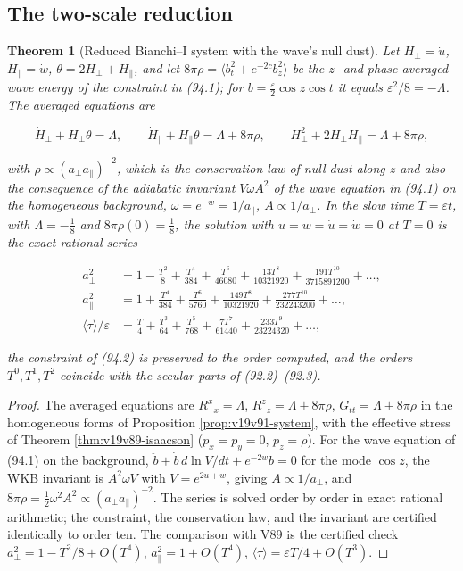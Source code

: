 \documentclass[11pt]{article}
\newtheorem{theorem}{Theorem}[section]
\theoremstyle{remark}
\begin{document}
\subsection{The two-scale reduction}

\begin{theorem}[Reduced Bianchi--I system with the wave's null dust]
\label{thm:v19v91-reduced}
Let \(H_\perp=\dot u\), \(H_\parallel=\dot w\),
\(\theta=2H_\perp+H_\parallel\), and let
\(8\pi\rho=\langle b_t^2+e^{-2c}b_z^2\rangle\) be the \(z\)- and
phase-averaged wave energy of the constraint in (94.1); for
\(b=\tfrac\varepsilon2\cos z\cos t\) it equals \(\varepsilon^2/8=-\Lambda\).
The averaged equations are

\[
 \dot H_\perp+H_\perp\theta=\Lambda,\qquad
 \dot H_\parallel+H_\parallel\theta=\Lambda+8\pi\rho,\qquad
 H_\perp^2+2H_\perp H_\parallel=\Lambda+8\pi\rho,                      \tag{94.2}
\]

with \(\rho\propto(a_\perp a_\parallel)^{-2}\), which is the
conservation law of null dust along \(z\) and also the consequence of
the adiabatic invariant \(V\omega A^2\) of the wave equation in (94.1)
on the homogeneous background, \(\omega=e^{-w}=1/a_\parallel\),
\(A\propto1/a_\perp\).  In the slow time \(T=\varepsilon t\), with
\(\Lambda=-\tfrac18\) and \(8\pi\rho(0)=\tfrac18\), the solution with
\(u=w=\dot u=\dot w=0\) at \(T=0\) is the exact rational series

\[
\begin{aligned}
 a_\perp^2&=1-\frac{T^2}8+\frac{T^4}{384}+\frac{T^6}{46080}+\frac{13T^8}{10321920}+\frac{191T^{10}}{3715891200}+\dots,\\
 a_\parallel^2&=1+\frac{T^4}{384}+\frac{T^6}{5760}+\frac{149T^8}{10321920}+\frac{277T^{10}}{232243200}+\dots,\\
 \langle\tau\rangle/\varepsilon&=\frac T4+\frac{T^3}{64}+\frac{T^5}{768}+\frac{7T^7}{61440}+\frac{233T^9}{23224320}+\dots,
\end{aligned}                                                          \tag{94.3}
\]

the constraint of (94.2) is preserved to the order computed, and the
orders \(T^0,T^1,T^2\) coincide with the secular parts of
(92.2)--(92.3).
\end{theorem}

\begin{proof}
The averaged equations are \(R^x{}_x=\Lambda\),
\(R^z{}_z=\Lambda+8\pi\rho\), \(G_{tt}=\Lambda+8\pi\rho\) in the
homogeneous forms of Proposition \ref{prop:v19v91-system}, with the
effective stress of Theorem \ref{thm:v19v89-isaacson}
(\(p_x=p_y=0\), \(p_z=\rho\)).  For the wave equation of (94.1) on the
background, \(\ddot b+\dot b\,d\ln V/dt+e^{-2w}b=0\) for the mode
\(\cos z\), the WKB invariant is \(A^2\omega V\) with \(V=e^{2u+w}\),
giving \(A\propto1/a_\perp\), and
\(8\pi\rho=\tfrac12\omega^2A^2\propto(a_\perp a_\parallel)^{-2}\).  The
series is solved order by order in exact rational arithmetic; the
constraint, the conservation law, and the invariant are certified
identically to order ten.  The comparison with V89 is the certified
check \(a_\perp^2=1-T^2/8+O(T^4)\), \(a_\parallel^2=1+O(T^4)\),
\(\langle\tau\rangle=\varepsilon T/4+O(T^3)\).
\end{proof}
\end{document}
